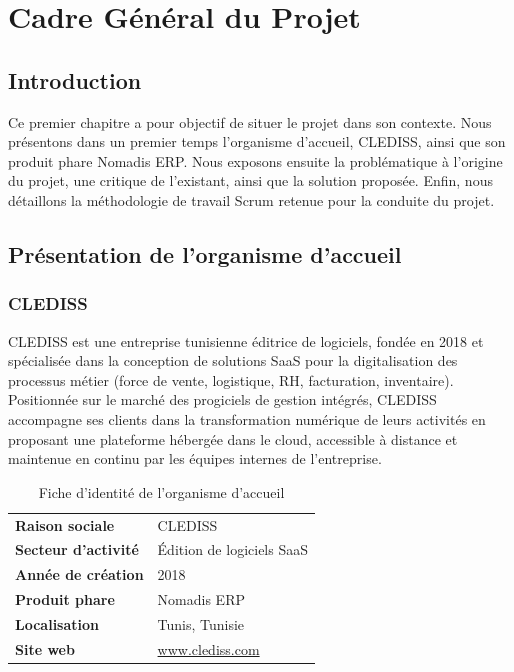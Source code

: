 \chapter{Cadre Général du Projet}
\label{chap-cadre-general}

\section*{Introduction}

Ce premier chapitre a pour objectif de situer le projet dans son contexte. Nous présentons dans un premier temps l'organisme d'accueil, CLEDISS, ainsi que son produit phare Nomadis ERP. Nous exposons ensuite la problématique à l'origine du projet, une critique de l'existant, ainsi que la solution proposée. Enfin, nous détaillons la méthodologie de travail Scrum retenue pour la conduite du projet.

\section{Présentation de l'organisme d'accueil}

\subsection{CLEDISS}

CLEDISS est une entreprise tunisienne éditrice de logiciels, fondée en 2018 et spécialisée dans la conception de solutions SaaS pour la digitalisation des processus métier (force de vente, logistique, RH, facturation, inventaire). Positionnée sur le marché des progiciels de gestion intégrés, CLEDISS accompagne ses clients dans la transformation numérique de leurs activités en proposant une plateforme hébergée dans le cloud, accessible à distance et maintenue en continu par les équipes internes de l'entreprise.

\begin{table}[H]
\centering
\caption{Fiche d'identité de l'organisme d'accueil}
\begin{tabularx}{\linewidth}{@{}l X@{}}
\toprule
\textbf{Raison sociale} & CLEDISS \\
\textbf{Secteur d'activité} & Édition de logiciels SaaS \\
\textbf{Année de création} & 2018 \\
\textbf{Produit phare} & Nomadis ERP \\
\textbf{Localisation} & Tunis, Tunisie \\
\textbf{Site web} & \url{www.clediss.com} \\
\bottomrule
\end{tabularx}
\end{table}

